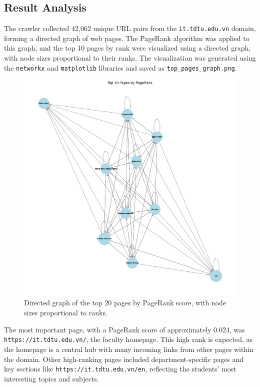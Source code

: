 \subsection{Result Analysis}
\label{subsec:result-analysis}

The crawler collected 42,062 unique URL pairs from the \texttt{it.tdtu.edu.vn} domain, forming a directed graph of web pages.
The PageRank algorithm was applied to this graph, and the top 10 pages by rank were visualized using a directed graph, with node sizes proportional to their ranks.
The visualization was generated using the \texttt{networkx} and \texttt{matplotlib} libraries and saved as \texttt{top\_pages\_graph.png}.

\begin{figure}[H]
    \centering
    \includegraphics[width=0.6\linewidth]{images/top_pages_web}
    \caption{Directed graph of the top 20 pages by PageRank score, with node sizes proportional to ranks.}
    \label{fig:top_pages_graph}
\end{figure}

The most important page, with a PageRank score of approximately 0.024, was \texttt{https://it.tdtu.edu.vn/}, the faculty homepage.
This high rank is expected, as the homepage is a central hub with many incoming links from other pages within the domain.
Other high-ranking pages included department-specific pages and key sections like \texttt{https://it.tdtu.edu.vn/en}, reflecting the students' most interesting topics and subjects.